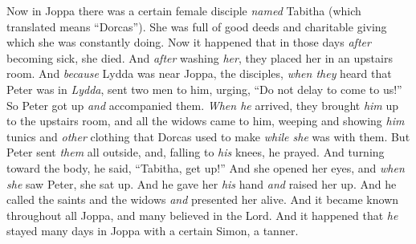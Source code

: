 \begin{biblechapter}
 Now in Joppa there was a certain female disciple \textit{named} Tabitha (which translated means “Dorcas”). She was full of good deeds and charitable giving which she was constantly doing.
\verse Now it happened that in those days \textit{after} becoming sick, she died. And \textit{after} washing \textit{her}, they placed her in an upstairs room.
\verse And \textit{because} Lydda was near Joppa, the disciples, \textit{when they} heard that Peter was in \textit{Lydda}, sent two men to him, urging, “Do not delay to come to us!”
\verse So Peter got up \textit{and} accompanied them. \textit{When he} arrived, they brought \textit{him} up to the upstairs room, and all the widows came to him, weeping and showing \textit{him} tunics and \textit{other} clothing that Dorcas used to make \textit{while she} was with them.
\verse But Peter sent \textit{them} all outside, and, falling to \textit{his} knees, he prayed. And turning toward the body, he said, “Tabitha, get up!” And she opened her eyes, and \textit{when she} saw Peter, she sat up.
\verse And he gave her \textit{his} hand \textit{and} raised her up. And he called the saints and the widows \textit{and} presented her alive.
\verse And it became known throughout all Joppa, and many believed in the Lord.
\verse And it happened that \textit{he} stayed many days in Joppa with a certain Simon, a tanner.
\end{biblechapter}

